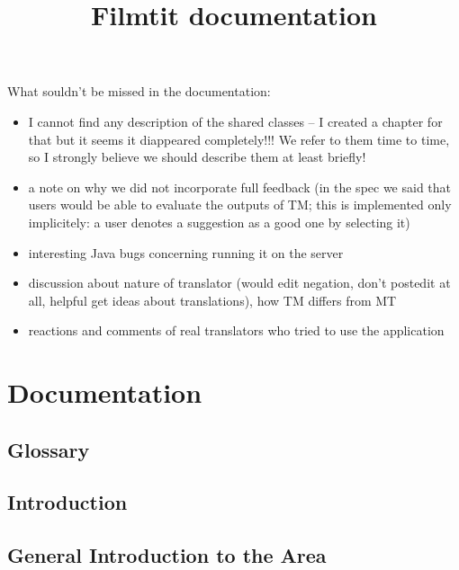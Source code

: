 \documentclass[11pt, oneside]{book}
\title{Filmtit documentation}
\author{}
\begin{document}

{\huge What souldn't be missed in the documentation:
\begin{itemize}

\item I cannot find any description of the shared classes -- I created a chapter for that but it seems it diappeared completely!!! We refer to them time to time, so I strongly believe we should describe them at least briefly!

\item a note on why we did not incorporate full feedback (in the spec we said that users would be able to evaluate the outputs of TM; this is implemented only implicitely: a user denotes a suggestion as a good one by selecting it)

\item interesting Java bugs concerning running it on the server

\item discussion about nature of translator (would edit negation, don't postedit at all, helpful get ideas about translations), how TM differs from MT

\item reactions and comments of real translators who tried to use the application

\end{itemize}
}

\newpage


\tableofcontents
\sloppy

\newpage

\setcounter{page}{1}

\part{Documentation}


\chapter*{Glossary}



\chapter{Introduction}


\chapter{General Introduction to the Area}

\end{document}
